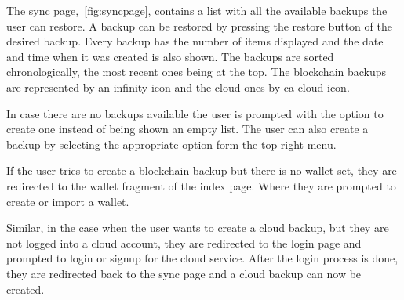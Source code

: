 \documentclass[a4paper,12pt]{report}
\begin{document}
The sync page,~\autoref{fig:syncpage}, contains a list with all the available
backups the user can restore. A backup can be restored by pressing the restore
button of the desired backup. Every backup has the number of items displayed
and the date and time when it was created is also shown. The backups are sorted
chronologically, the most recent ones being at the top. The blockchain backups
are represented by an infinity icon and the cloud ones by ca cloud icon.

In case there are no backups available the user is prompted with the option to
create one instead of being shown an empty list. The user can also create a
backup by selecting the appropriate option form the top right menu.

If the user tries to create a blockchain backup but there is no wallet set,
they are redirected to the wallet fragment of the index page. Where they are
prompted to create or import a wallet.

Similar, in the case when the user wants to create a cloud backup, but they are
not logged into a cloud account, they are redirected to the login page and
prompted to login or signup for the cloud service. After the login process is
done, they are redirected back to the sync page and a cloud backup can now be
created.
\end{document}
